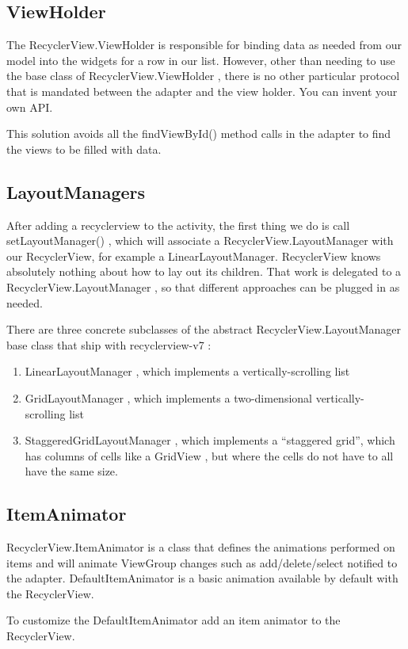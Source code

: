 \subsection{ViewHolder}
The RecyclerView.ViewHolder is responsible for binding data as needed from our
model into the widgets for a row in our list. However, other than needing to use the base class of RecyclerView.ViewHolder ,
there is no other particular protocol that is mandated between the adapter and the
view holder. You can invent your own API.

This solution avoids all the findViewById() method calls in the adapter to find the views to be filled with data.

\subsection{LayoutManagers}
After adding a recyclerview to the activity, the first thing we do is call setLayoutManager() ,
which will associate a RecyclerView.LayoutManager with our RecyclerView, for example a LinearLayoutManager. RecyclerView
knows absolutely nothing about how to lay out its children. That work is delegated
to a RecyclerView.LayoutManager , so that different approaches can be plugged in as
needed.

There are three concrete subclasses of the abstract RecyclerView.LayoutManager
base class that ship with recyclerview-v7 :
\begin{enumerate}
	\item LinearLayoutManager , which implements a vertically-scrolling list
	\item GridLayoutManager ,
	which implements a two-dimensional vertically-
	scrolling list
	\item StaggeredGridLayoutManager , which implements a “staggered grid”, which
	has columns of cells like a GridView , but where the cells do not have to all
	have the same size.
\end{enumerate}


\subsection{ItemAnimator}
RecyclerView.ItemAnimator is a class that defines the animations performed on items and will animate ViewGroup changes such as add/delete/select notified to the adapter. DefaultItemAnimator is a basic animation available by default with the RecyclerView.

To customize the DefaultItemAnimator add an item animator to the RecyclerView. 


